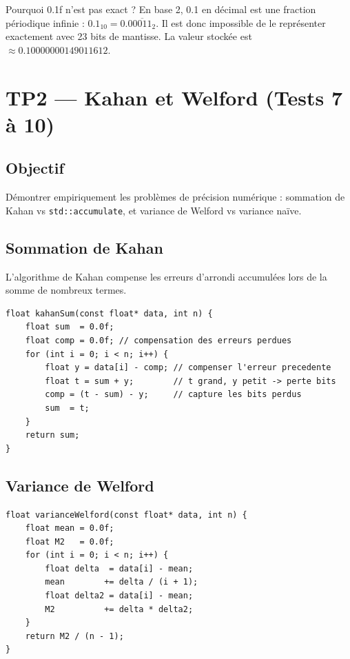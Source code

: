\documentclass[12pt,a4paper]{report}
\begin{document}
\begin{infobox}{Pourquoi 0.1f n'est pas exact ?}
En base 2, 0.1 en décimal est une fraction périodique infinie :
$0.1_{10} = 0.0\overline{0011}_{2}$. Il est donc impossible de le
représenter exactement avec 23 bits de mantisse. La valeur stockée
est $\approx 0.10000000149011612$.
\end{infobox}

\section{TP2 --- Kahan et Welford (Tests 7 à 10)}

\subsection{Objectif}

Démontrer empiriquement les problèmes de précision numérique :
sommation de Kahan vs \texttt{std::accumulate}, et variance de
Welford vs variance naïve.

\subsection{Sommation de Kahan}

L'algorithme de Kahan compense les erreurs d'arrondi accumulées lors
de la somme de nombreux termes.

\begin{lstlisting}[caption={Float.cpp --- kahanSum}]
float kahanSum(const float* data, int n) {
    float sum  = 0.0f;
    float comp = 0.0f; // compensation des erreurs perdues
    for (int i = 0; i < n; i++) {
        float y = data[i] - comp; // compenser l'erreur precedente
        float t = sum + y;        // t grand, y petit -> perte bits
        comp = (t - sum) - y;     // capture les bits perdus
        sum  = t;
    }
    return sum;
}
\end{lstlisting}

\subsection{Variance de Welford}

\begin{lstlisting}[caption={Float.cpp --- varianceWelford}]
float varianceWelford(const float* data, int n) {
    float mean = 0.0f;
    float M2   = 0.0f;
    for (int i = 0; i < n; i++) {
        float delta  = data[i] - mean;
        mean        += delta / (i + 1);
        float delta2 = data[i] - mean;
        M2          += delta * delta2;
    }
    return M2 / (n - 1);
}
\end{lstlisting}
\end{document}
